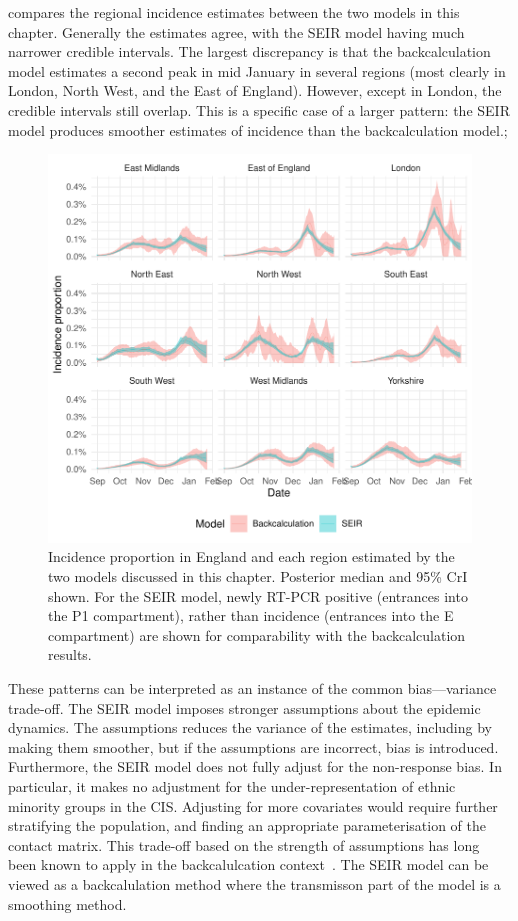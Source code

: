 \documentclass[thesis.tex]{subfiles}
\begin{document}
 compares the regional incidence estimates between the two models in this chapter.
Generally the estimates agree, with the SEIR model having much narrower credible intervals.
The largest discrepancy is that the backcalculation model estimates a second peak in mid January in several regions (most clearly in London, North West, and the East of England).
However, except in London, the credible intervals still overlap.
This is a specific case of a larger pattern: the SEIR model produces smoother estimates of incidence than the backcalculation model.;
\begin{figure}
    \centering \includegraphics{transmission/compare-regions}
    \caption[Comparing each models estimate of regional incidence.]{%
        Incidence proportion in England and each region estimated by the two models discussed in this chapter.
        Posterior median and 95\% CrI shown.
        For the SEIR model, newly RT-PCR positive (entrances into the P1 compartment), rather than incidence (entrances into the E compartment) are shown for comparability with the backcalculation results.
    }
    \label{transmission:fig:compare-regions}
\end{figure}

These patterns can be interpreted as an instance of the common bias---variance trade-off.
The SEIR model imposes stronger assumptions about the epidemic dynamics.
The assumptions reduces the variance of the estimates, including by making them smoother, but if the assumptions are incorrect, bias is introduced.
Furthermore, the SEIR model does not fully adjust for the non-response bias.
In particular, it makes no adjustment for the under-representation of ethnic minority groups in the CIS.
Adjusting for more covariates would require further stratifying the population, and finding an appropriate parameterisation of the contact matrix.
This trade-off based on the strength of assumptions has long been known to apply in the backcalulcation context~\autocite[e.g.][section 8.3]{brookmeyerBackcalculation}.
The SEIR model can be viewed as a backcalulation method where the transmisson part of the model is a smoothing method.
\end{document}
